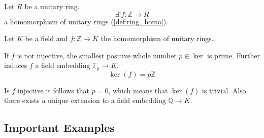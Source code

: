 \begin{proposition}
   Let \(R\) be a unitary ring.
   \[\exists! f: \mathbb{Z} \to R\]
   a homomorphism of unitary rings (\ref{def:ring_homo}).
\end{proposition}

\begin{proposition}
   Let \(K\) be a field and \(f: \mathbb{Z} \to K\) the homomorphism of unitary rings.

   If \(f\) is not injective, the smallest positive whole number \(p \in \ker\) is prime.
   Further induces \(f\) a field embedding \(\mathbb{F}_p \to K\).
   \[\ker(f) = p\mathbb{Z}\]

   Is \(f\) injective it follows that \(p = 0\), which means that \(\ker(f)\) is trivial.
   Also there exists a unique extension to a field embedding \(\mathbb{Q} \to K\).
\end{proposition}


\subsection{Important Examples}
